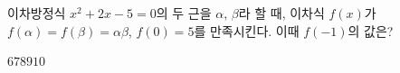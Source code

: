 이차방정식 $x^2+2x-5=0$의 두 근을 $\alpha$, $\beta$라 할 때, 이차식 $f(x)$가 $f(\alpha)=f(\beta)=\alpha\beta$, $f(0)=5$를 만족시킨다. 이때 $f(-1)$의 값은?
\begin{choices32}{$6$}{$7$}{$8$}{$9$}{$10$}\end{choices32}
